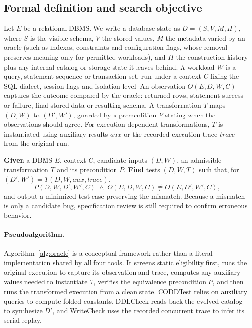 \subsection{Formal definition and search objective}\label{sec:formal}
Let $E$ be a relational DBMS. We write a database state as $D=(S,V,M,H)$, where $S$ is the visible schema, $V$ the stored values, $M$ the metadata varied by an oracle (such as indexes, constraints and configuration flags, whose removal preserves meaning only for permitted workloads), and $H$ the construction history plus any internal catalog or storage state it leaves behind. A workload $W$ is a query, statement sequence or transaction set, run under a context $C$ fixing the SQL dialect, session flags and isolation level. An observation $O(E,D,W,C)$ captures the outcome compared by the oracle: returned rows, statement success or failure, final stored data or resulting schema. A transformation $T$ maps $(D,W)$ to $(D',W')$, guarded by a precondition $P$ stating when the observations should agree. For execution-dependent transformations, $T$ is instantiated using auxiliary results $\mathit{aux}$ or the recorded execution trace $\mathit{trace}$ from the original run.

\begin{tcolorbox}[enhanced,colback=panelbg,colframe=panelborder,boxrule=0.5pt,arc=3pt,left=7pt,right=7pt,top=4pt,bottom=4pt]
\small
\textbf{Given} a DBMS $E$, context $C$, candidate inputs $(D,W)$, an admissible transformation $T$ and its precondition $P$.
\textbf{Find} tests $(D,W,T)$ such that, for $(D',W')=T(D,W,\mathit{aux},\mathit{trace})$,
\[
P(D,W,D',W',C)\;\wedge\;O(E,D,W,C)\not\equiv O(E,D',W',C),
\]
and output a minimized test case preserving the mismatch. Because a mismatch is only a candidate bug, specification review is still required to confirm erroneous behavior.
\end{tcolorbox}

\paragraph{Pseudoalgorithm.} Algorithm~\ref{alg:oracle} is a conceptual framework rather than a literal implementation shared by all four tools. It screens static eligibility first, runs the original execution to capture its observation and trace, computes any auxiliary values needed to instantiate $T$, verifies the equivalence precondition $P$, and then runs the transformed execution from a clean state. CODDTest relies on auxiliary queries to compute folded constants, DDLCheck reads back the evolved catalog to synthesize $D'$, and WriteCheck uses the recorded concurrent trace to infer its serial replay.


